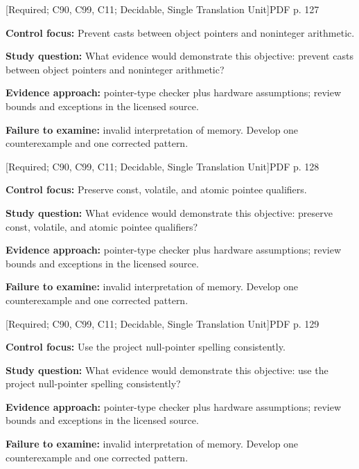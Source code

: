 \documentclass[10pt,letterpaper]{article}
\begin{document}
\smallskip
{}
 \textsf{\footnotesize [Required; C90, C99, C11; Decidable, Single Translation Unit]}\hfill{\footnotesize PDF p. 127}\par
\textbf{Control focus:} Prevent casts between object pointers and noninteger arithmetic.\par
\textbf{Study question:} What evidence would demonstrate this objective: prevent casts between object pointers and noninteger arithmetic?\par
\textbf{Evidence approach:} pointer-type checker plus hardware assumptions; review bounds and exceptions in the licensed source.\par
\textbf{Failure to examine:} invalid interpretation of memory. Develop one counterexample and one corrected pattern.\par
\smallskip
{}
 \textsf{\footnotesize [Required; C90, C99, C11; Decidable, Single Translation Unit]}\hfill{\footnotesize PDF p. 128}\par
\textbf{Control focus:} Preserve const, volatile, and atomic pointee qualifiers.\par
\textbf{Study question:} What evidence would demonstrate this objective: preserve const, volatile, and atomic pointee qualifiers?\par
\textbf{Evidence approach:} pointer-type checker plus hardware assumptions; review bounds and exceptions in the licensed source.\par
\textbf{Failure to examine:} invalid interpretation of memory. Develop one counterexample and one corrected pattern.\par
\smallskip
{}
 \textsf{\footnotesize [Required; C90, C99, C11; Decidable, Single Translation Unit]}\hfill{\footnotesize PDF p. 129}\par
\textbf{Control focus:} Use the project null-pointer spelling consistently.\par
\textbf{Study question:} What evidence would demonstrate this objective: use the project null-pointer spelling consistently?\par
\textbf{Evidence approach:} pointer-type checker plus hardware assumptions; review bounds and exceptions in the licensed source.\par
\textbf{Failure to examine:} invalid interpretation of memory. Develop one counterexample and one corrected pattern.\par
\end{document}

